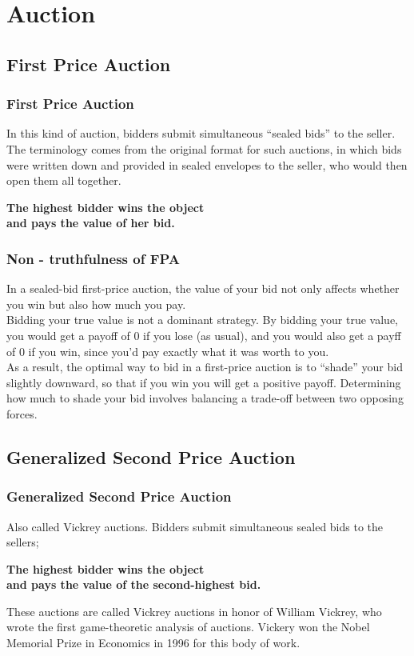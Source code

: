 \documentclass{beamer}
\begin{document}
\section{Auction}

\subsection{First Price Auction}
\begin{frame}
\frametitle{First Price Auction}
In this kind of auction, bidders submit simultaneous ``sealed bids'' to the seller. The terminology comes from the original format for such auctions, in which bids were written down and provided in sealed envelopes to the seller, who would then open them all together.\\
\medskip
\begin{center}\textbf{The highest bidder wins the object \\ and pays the value of her bid.}\end{center}
\end{frame}

\begin{frame}
\frametitle{Non - truthfulness of FPA}
In a sealed-bid first-price auction, the value of your bid not only affects whether you win but also how much you pay.\\
\medskip
Bidding your true value is not a dominant strategy. By bidding your true value, you would get a payoff of 0 if you lose (as usual), and you would also get a payff of 0 if you win, since you’d pay exactly what it was worth to you.\\
\medskip
As a result, the optimal way to bid in a first-price auction is to “shade” your bid slightly downward, so that if you win you will get a positive payoff. Determining how much to shade your bid involves balancing a trade-off between two opposing forces.
\end{frame}

\subsection{Generalized Second Price Auction}
\begin{frame}
\frametitle{Generalized Second Price Auction}
Also called Vickrey auctions. Bidders submit simultaneous sealed bids to the sellers;
\begin{center} 
\textbf{The highest bidder wins the object \\
and pays the value of the second-highest bid.} 
\end{center}
These auctions are called Vickrey auctions in honor of William Vickrey, who wrote the first game-theoretic analysis of auctions. Vickery won the Nobel Memorial Prize in Economics in 1996 for this body of work.
\end{frame}
\end{document}
